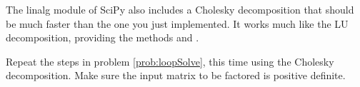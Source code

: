 
The linalg module of SciPy also includes a Cholesky decomposition that should be much faster than the one you just implemented. It works much like the LU decomposition, providing the methods  and .

\begin{problem}
Repeat the steps in problem \ref{prob:loopSolve}, this time using the
Cholesky decomposition. Make sure the input matrix to be factored is
positive definite.
\end{problem} 
